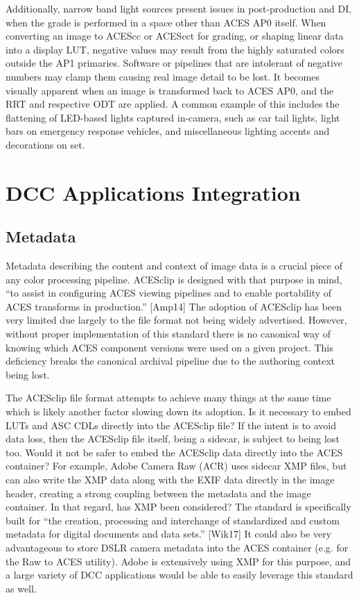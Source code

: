 \documentclass[conference]{IEEEtran}
\begin{document}
Additionally, narrow band light sources present issues in post-production and DI, when the grade is performed in a space other than ACES AP0 itself.  When converting an image to ACEScc or ACEScct for grading, or shaping linear data into a display LUT, negative values may result from the highly saturated colors outside the AP1 primaries. Software or pipelines that are intolerant of negative numbers may clamp them causing real image detail to be lost. It becomes visually apparent when an image is transformed back to ACES AP0, and the RRT and respective ODT are applied. A common example of this includes the flattening of LED-based lights captured in-camera, such as car tail lights, light bars on emergency response vehicles, and miscellaneous lighting accents and decorations on set.

\section{DCC Applications Integration}

\subsection{Metadata}
Metadata describing the content and context of image data is a crucial piece of any color processing pipeline. ACESclip is designed with that purpose in mind, “to assist in configuring ACES viewing pipelines and to enable portability of ACES transforms in production.” [Amp14] The adoption of ACESclip has been very limited due largely to the file format not being widely advertised. However, without proper implementation of this standard there is no canonical way of knowing which ACES component versions were used on a given project. This deficiency breaks the canonical archival pipeline due to the authoring context being lost.

The ACESclip file format attempts to achieve many things at the same time which is likely another factor slowing down its adoption. Is it necessary to embed LUTs and ASC CDLs directly into the ACESclip file? If the intent is to avoid data loss, then the ACESclip file itself, being a sidecar, is subject to being lost too. Would it not be safer to embed the ACESclip data directly into the ACES container? For example, Adobe Camera Raw (ACR) uses sidecar XMP files, but can also write the XMP data along with the EXIF data directly in the image header, creating a strong coupling between the metadata and the image container. In that regard, has XMP been considered? The standard is specifically built for “the creation, processing and interchange of standardized and custom metadata for digital documents and data sets.” [Wik17] It could also be very advantageous to store DSLR camera metadata into the ACES container (e.g. for the Raw to ACES utility). Adobe is extensively using XMP for this purpose, and a large variety of DCC applications would be able to easily leverage this standard as well.
\end{document}
